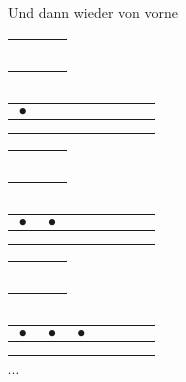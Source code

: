 \documentclass[a4paper]{amsart}
\theoremstyle{definition}
\begin{document}
Und dann wieder von vorne

\begin{tabular}{|cc|}
   \hline
   $\phantom\bullet$&$\phantom\bullet$\\
   \hline
\end{tabular}
\begin{tabular}{|cc|}
\hline
$\phantom\bullet$&$\phantom\bullet$\\
\hline
\end{tabular}
\begin{tabular}{|c|c|c|c|c|}
\hline
$\bullet$ & $\phantom\bullet$ & $\phantom\bullet$ & $\phantom\bullet$ & $\phantom\bullet$\\
\hline
$\phantom\bullet$ & $\phantom\bullet$ & $\phantom\bullet$ & $\phantom\bullet$ & $\phantom\bullet$\\
\hline
\end{tabular}

\begin{tabular}{|cc|}
   \hline
   $\phantom\bullet$&$\phantom\bullet$\\
   \hline
\end{tabular}
\begin{tabular}{|cc|}
\hline
$\phantom\bullet$&$\phantom\bullet$\\
\hline
\end{tabular}
\begin{tabular}{|c|c|c|c|c|}
\hline
$\bullet$ & $\bullet$ & $\phantom\bullet$ & $\phantom\bullet$ & $\phantom\bullet$\\
\hline
$\phantom\bullet$ & $\phantom\bullet$ & $\phantom\bullet$ & $\phantom\bullet$ & $\phantom\bullet$\\
\hline
\end{tabular}

\begin{tabular}{|cc|}
   \hline
   $\phantom\bullet$&$\phantom\bullet$\\
   \hline
\end{tabular}
\begin{tabular}{|cc|}
\hline
$\phantom\bullet$&$\phantom\bullet$\\
\hline
\end{tabular}
\begin{tabular}{|c|c|c|c|c|}
\hline
$\bullet$ & $\bullet$ & $\bullet$ & $\phantom\bullet$ & $\phantom\bullet$\\
\hline
$\phantom\bullet$ & $\phantom\bullet$ & $\phantom\bullet$ & $\phantom\bullet$ & $\phantom\bullet$\\
\hline
\end{tabular} $\cdots$
\end{document}
